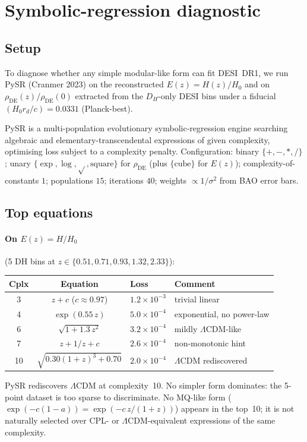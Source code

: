 \documentclass[11pt,letterpaper,twoside]{article}
\newcommand{\Lcdm}{\Lambda\mathrm{CDM}}
\newcommand{\rd}{r_{d}}
\newcommand{\DH}{D_{H}}
\newcommand{\rDE}{\rho_{\mathrm{DE}}}
\begin{document}
\section{Symbolic-regression diagnostic}\label{sec:pysr}

\subsection{Setup}

To diagnose whether any simple modular-like form can fit DESI~DR1, we run PySR
(Cranmer 2023) on the reconstructed $E(z)=H(z)/H_{0}$ and on
$\rDE(z)/\rDE(0)$ extracted from the $\DH$-only DESI bins under a fiducial
$(H_{0}\rd/c)=0.0331$ (Planck-best).

PySR is a multi-population evolutionary symbolic-regression engine searching
algebraic and elementary-transcendental expressions of given complexity,
optimising loss subject to a complexity penalty. Configuration: binary
$\{+,-,*,/\}$; unary $\{\exp,\log,\sqrt{},\text{square}\}$ for $\rDE$ (plus
$\{\text{cube}\}$ for $E(z)$); complexity-of-constants $1$; populations $15$;
iterations $40$; weights $\propto1/\sigma^{2}$ from BAO error bars.

\subsection{Top equations}

\paragraph{On $E(z)=H/H_{0}$} (5 DH bins at $z\in\{0.51,0.71,0.93,1.32,2.33\}$):

\begin{center}\small
\begin{tabular}{ccll}
\toprule
Cplx & Equation & Loss & Comment \\
\midrule
3  & $z+c$ ($c\approx0.97$)        & $1.2\times10^{-3}$ & trivial linear \\
4  & $\exp(0.55\,z)$               & $5.0\times10^{-4}$ & exponential, no power-law \\
6  & $\sqrt{1+1.3\,z^{2}}$         & $3.2\times10^{-4}$ & mildly $\Lcdm$-like \\
7  & $z+1/z+c$                     & $2.6\times10^{-4}$ & non-monotonic hint \\
10 & $\sqrt{0.30(1+z)^{3}+0.70}$   & $2.0\times10^{-4}$ & $\Lcdm$ rediscovered \\
\bottomrule
\end{tabular}
\end{center}
PySR rediscovers $\Lcdm$ at complexity~10. No simpler form dominates: the
5-point dataset is too sparse to discriminate. No MQ-like form
($\exp(-c(1-a))=\exp(-c\,z/(1+z))$) appears in the top~10; it is not naturally
selected over CPL- or $\Lcdm$-equivalent expressions of the same complexity.
\end{document}
